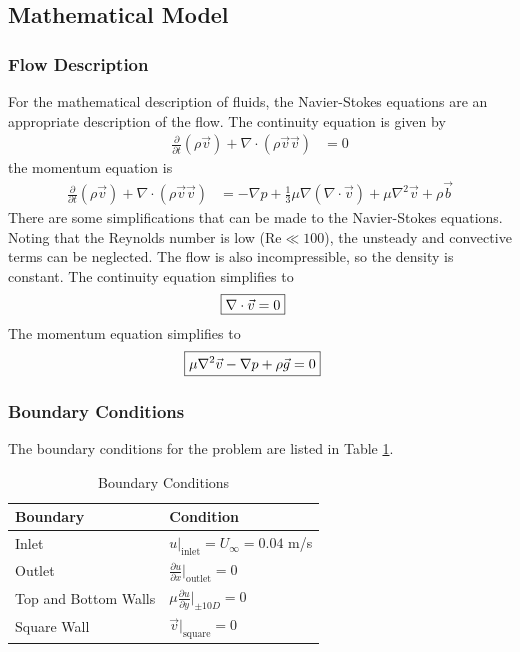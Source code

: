 \subsection{Mathematical Model}
\subsubsection{Flow Description}
For the mathematical description of fluids, the Navier-Stokes equations are an appropriate description of the flow. The continuity equation is given by
\begin{align*}
    \frac{\partial}{\partial t} (\rho \vec{v}) + \nabla \cdot (\rho \vec{v} \vec{v}) &= 0
\end{align*}
the momentum equation is 
\begin{align*}
    \frac{\partial}{\partial t} (\rho \vec{v}) + \nabla \cdot (\rho \vec{v} \vec{v}) &= -\nabla p + \frac{1}{3} \mu \nabla (\nabla \cdot \vec{v}) + \mu \nabla^2 \vec{v} + \rho \vec{b}
\end{align*}
There are some simplifications that can be made to the Navier-Stokes equations. Noting that the Reynolds number is low ($\text{Re} \ll 100$), the unsteady and convective terms can be neglected. The flow is also incompressible, so the density is constant. The continuity equation simplifies to
\begin{align*}
    \Aboxed{\nabla \cdot \vec{v} &= 0}
\end{align*}
The momentum equation simplifies to
\begin{align*}
    \Aboxed{\mu \nabla^2 \vec{v} - \nabla p + \rho \vec{g} &= 0}
\end{align*}

\subsubsection{Boundary Conditions}
The boundary conditions for the problem are listed in Table \ref{tab:boundary_conditions}.
\begin{table}[H]
    \centering
    \caption{Boundary Conditions}
    \label{tab:boundary_conditions}
    \begin{tabular}{ll}
        \toprule
        Boundary & Condition \\
        \midrule
        Inlet & $\displaystyle u|_{\text{inlet}} = U_\infty = 0.04$ m/s \\[2ex]
        Outlet & $\displaystyle \frac{\partial u}{\partial x}\bigg|_{\text{outlet}} = 0$ \\[2ex]
        Top and Bottom Walls & $\displaystyle \mu \frac{\partial u}{\partial y}\bigg|_{\pm 10D} = 0$ \\[2ex]
        Square Wall & $\displaystyle \vec{v}|_{\text{square}} = 0$ \\
        \bottomrule
    \end{tabular}
\end{table}

